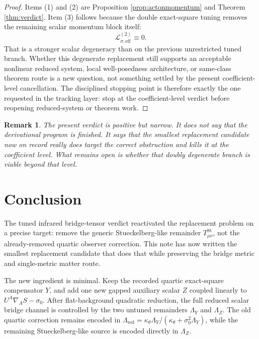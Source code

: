 \documentclass[11pt]{article}
\newtheorem{remark}{Remark}
\begin{document}
\begin{proof}
Items (1) and (2) are Proposition \ref{prop:actonmomentum} and Theorem \ref{thm:verdict}. Item (3) follows because the double exact-square tuning removes the remaining scalar momentum block itself:
\[
\mathcal L_{\hat\sigma,\mathrm{eff}}^{(2)}\equiv 0.
\]
That is a stronger scalar degeneracy than on the previous unrestricted tuned branch. Whether this degenerate replacement still supports an acceptable nonlinear reduced system, local well-posedness architecture, or same-class theorem route is a new question, not something settled by the present coefficient-level cancellation. The disciplined stopping point is therefore exactly the one requested in the tracking layer: stop at the coefficient-level verdict before reopening reduced-system or theorem work.
\end{proof}

\begin{remark}
The present verdict is positive but narrow. It does not say that the derivational program is finished. It says that the smallest replacement candidate now on record really does target the correct obstruction and kills it at the coefficient level. What remains open is whether that doubly degenerate branch is viable beyond that level.
\end{remark}

\section{Conclusion}

The tuned infrared bridge-tensor verdict reactivated the replacement problem on a precise target: remove the generic Stueckelberg-like remainder \(T_{\mu\nu}^{\mathrm{St}}\), not the already-removed quartic observer correction. This note has now written the smallest replacement candidate that does that while preserving the bridge metric and single-metric matter route.

The new ingredient is minimal. Keep the recorded quartic exact-square compensator \(Y\), and add one new gapped auxiliary scalar \(Z\) coupled linearly to \(U^A\nabla_A S-\sigma_0\). After flat-background quadratic reduction, the full reduced scalar bridge channel is controlled by the two untuned remainders \(\Lambda_Y\) and \(\Lambda_Z\). The old quartic correction remains encoded in \(\Lambda_{\mathrm{red}}=\kappa_\theta\Lambda_Y/(\kappa_\theta+\sigma_0^2\Lambda_Y)\), while the remaining Stueckelberg-like source is encoded directly in \(\Lambda_Z\).
\end{document}
